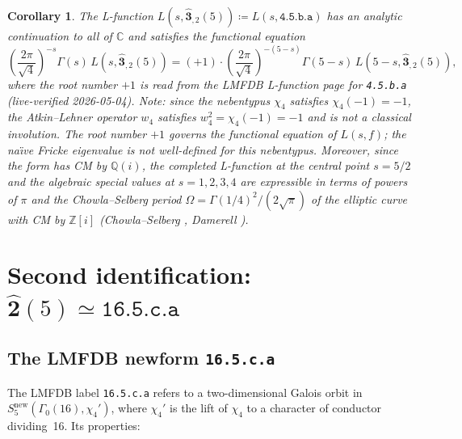 \documentclass[12pt]{amsart}
\newtheorem{corollary}[theorem]{Corollary}
\theoremstyle{definition}
\newcommand{\Z}{\mathbb{Z}}
\newcommand{\Q}{\mathbb{Q}}
\newcommand{\C}{\mathbb{C}}
\newcommand{\Gam}{\Gamma}
\newcommand{\lmfdb}[1]{\texttt{#1}}  %
\newcommand{\hhat}[1]{\widehat{\mathbf{#1}}}  %
\begin{document}
\begin{corollary}\label{cor:CM-inherit}
  The L-function
  $L(s, \hhat{3}_{,2}(5)) \coloneqq L(s, \lmfdb{4.5.b.a})$
  has an analytic continuation to all of $\C$ and satisfies the functional
  equation
  \[
    \left(\frac{2\pi}{\sqrt{4}}\right)^{-s}\Gamma(s)\,
    L(s,\hhat{3}_{,2}(5))
    = (+1) \cdot
    \left(\frac{2\pi}{\sqrt{4}}\right)^{-(5-s)}\Gamma(5-s)\,
    L(5-s,\hhat{3}_{,2}(5)),
  \]
  where the root number $+1$ is read from the LMFDB L-function page for
  \lmfdb{4.5.b.a} (live-verified 2026-05-04).
  Note: since the nebentypus $\chi_4$ satisfies $\chi_4(-1)=-1$, the
  Atkin--Lehner operator $w_4$ satisfies $w_4^2 = \chi_4(-1) = -1$ and
  is not a classical involution.  The root number $+1$ governs the
  functional equation of $L(s,f)$; the na\"{\i}ve Fricke eigenvalue
  is not well-defined for this nebentypus.
  Moreover, since the form has CM by $\Q(i)$, the completed
  L-function at the central point $s=5/2$ and the algebraic
  special values at $s=1,2,3,4$ are expressible in terms of
  powers of $\pi$ and the Chowla--Selberg period
  $\Omega = \Gamma(1/4)^2 / (2\sqrt{\pi})$
  of the elliptic curve with CM by $\Z[i]$
  \textup{(Chowla--Selberg \cite{ChowlaSelberg67}, Damerell
  \cite{Damerell71})}.
\end{corollary}

\section{Second identification: \texorpdfstring{$\hhat{2}(5) \simeq
         \lmfdb{16.5.c.a}$}{2-hat(5) = 16.5.c.a}}
\label{sec:second-id}

\subsection{The LMFDB newform \texttt{16.5.c.a}}

The LMFDB label \lmfdb{16.5.c.a} refers to a two-dimensional Galois orbit
in $S_5^{\mathrm{new}}(\Gam_0(16), \chi_4')$, where $\chi_4'$ is the
lift of $\chi_4$ to a character of conductor dividing~16.  Its properties:
\end{document}
